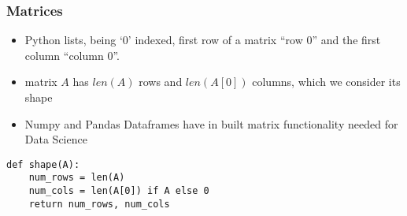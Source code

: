 \begin{frame}[fragile]\frametitle{Matrices}
\begin{itemize}
\item  Python lists, being `0' indexed, first row of a matrix ``row 0'' and the first column ``column 0''.
\item  matrix  $A$  has  $len(A)$  rows and  $len(A[0])$ columns, which we consider its  shape
\item Numpy and Pandas Dataframes have in built matrix functionality needed for Data Science
\end{itemize}
\begin{lstlisting}
def shape(A):
    num_rows = len(A)
    num_cols = len(A[0]) if A else 0 
    return num_rows, num_cols
\end{lstlisting}
\end{frame}
